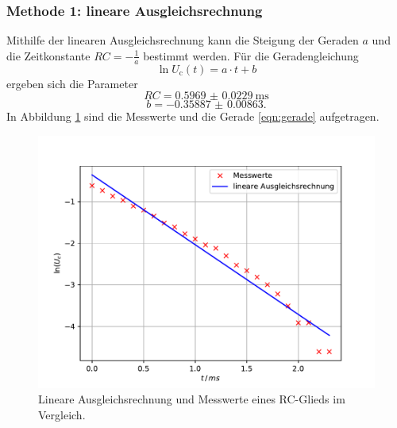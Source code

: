 \subsubsection{Methode 1: lineare Ausgleichsrechnung}
Mithilfe der linearen Ausgleichsrechnung kann die Steigung der Geraden $a$ und die Zeitkonstante $RC=-\frac{1}{a}$ bestimmt werden.
Für die Geradengleichung
\begin{equation}
    \ln U_\text{c}(t) = a \cdot t + b
    \label{eqn:gerade}
\end{equation}
ergeben sich die Parameter
\begin{equation*}
    RC = \SI{0.5969(229)}{\milli\second}
\end{equation*}
\begin{equation*}
    b = \SI{-0.35887(863)} .
\end{equation*}
In Abbildung \ref{fig:plota} sind die Messwerte und die Gerade \ref{eqn:gerade} aufgetragen.
\begin{figure}
    \centering
    \includegraphics[width=\textwidth]{content/data/plota.pdf}
    \caption{Lineare Ausgleichsrechnung und Messwerte eines RC-Glieds im Vergleich.}
    \label{fig:plota}
\end{figure}
\FloatBarrier

